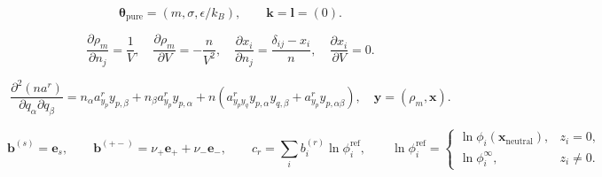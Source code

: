 \documentclass[11pt]{article}
\begin{document}
\begin{equation}
\boldsymbol{\theta}_{\mathrm{pure}}
=\left(m,\sigma,\epsilon/k_B\right),
\qquad
\boldsymbol{k}=\boldsymbol{l}=(0).
\label{eq:pure_active_parameter_mapping}
\end{equation}

\begin{equation}
\frac{\partial\rho_m}{\partial n_j}=\frac{1}{V},
\quad
\frac{\partial\rho_m}{\partial V}=-\frac{n}{V^2},
\quad
\frac{\partial x_i}{\partial n_j}=\frac{\delta_{ij}-x_i}{n},
\quad
\frac{\partial x_i}{\partial V}=0.
\label{eq:electrolyte_phase_coordinate_jacobian}
\end{equation}

\begin{equation}
\frac{\partial^2(na^r)}{\partial q_\alpha\partial q_\beta}
=n_\alpha a^r_{y_p}y_{p,\beta}
+n_\beta a^r_{y_p}y_{p,\alpha}
+n\left(
a^r_{y_py_q}y_{p,\alpha}y_{q,\beta}
+a^r_{y_p}y_{p,\alpha\beta}
\right),
\quad
\boldsymbol{y}=(\rho_m,\boldsymbol{x}).
\label{eq:electrolyte_phase_hessian_chain_rule}
\end{equation}

\begin{equation}
\boldsymbol{b}^{(s)}=\boldsymbol{e}_s,
\qquad
\boldsymbol{b}^{(+-)}=\nu_+\boldsymbol{e}_+
+\nu_-\boldsymbol{e}_-,
\qquad
c_r=\sum_i b_i^{(r)}\ln\phi_i^{\mathrm{ref}},
\qquad
\ln\phi_i^{\mathrm{ref}}=
\begin{cases}
\ln\phi_i(\boldsymbol{x}_{\mathrm{neutral}}), & z_i=0,\\
\ln\phi_i^\infty, & z_i\ne 0.
\end{cases}
\label{eq:neutral_reference_stoichiometric_basis}
\end{equation}
\end{document}
